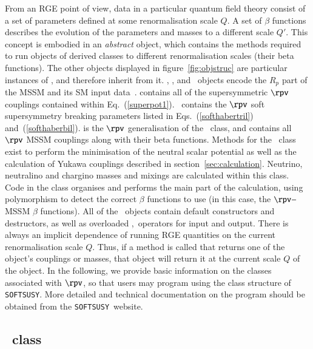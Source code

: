 \documentclass[final,3p,times,pdflatex]{elsarticle}
\def\SOFTSUSY{{\tt SOFTSUSY}}
\begin{document}
From an RGE point of view, data in a particular quantum field theory 
consist of a set of parameters defined at some
renormalisation scale $Q$. 
A set of $\beta$ functions describes the
evolution of the parameters and masses to a different scale
$Q'$. This concept is embodied in an {\em abstract} 
object, which contains the methods required to run objects of derived
classes to different renormalisation scales (their beta functions). The other
objects 
displayed in figure~\ref{fig:objstruc} are particular instances of
, and therefore inherit from it. , ,
 and ~objects encode the $R_p$ part of the
MSSM and its SM input data~\cite{Allanach:2001kg}.
 contains all of the supersymmetric $\rpv$ couplings contained
within  Eq.~(\ref{superpot1}). 
~contains the $\rpv$ soft supersymmetry breaking parameters
listed in 
Eqs.~(\ref{softhabertril}) and~(\ref{softhaberbil}).  is
the $\rpv$  
generalisation of the ~class, and contains all $\rpv$ MSSM
couplings along with their beta functions.
Methods for the ~class exist to perform the minimisation of
the neutral scalar potential as well as the
calculation of Yukawa couplings described in section~\ref{sec:calculation}. 
Neutrino, neutralino and chargino masses and mixings are calculated within
this class. 
Code in
the  class organises and performs the main part of
the calculation, using polymorphism to detect the correct $\beta$ functions to
use (in this case, the $\rpv-$MSSM $\beta$ functions). 
All of the ~objects contain default constructors
and destructors, as well as overloaded \code{>>},\code{<<}~operators for input
and output. 
There is always an implicit dependence of running RGE quantities on the
current renormalisation scale $Q$. Thus, if a method is called that returns
one of the object's couplings or masses, that object will return it at the
current scale $Q$ of the object. 
In the following, we provide basic information on the 
classes associated with $\rpv$, so that users may program using the class
structure of \SOFTSUSY\@. More detailed and
technical documentation on the program should be obtained from the
\SOFTSUSY~website. 


\subsection{~class}
\end{document}
